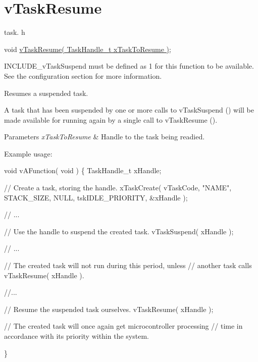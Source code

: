 \hypertarget{group__vTaskResume}{}\section{v\+Task\+Resume}
\label{group__vTaskResume}
task. h 
\begin{DoxyPre}void \hyperlink{task_8h_a84a1584f29fb7736a1aa72ad5b3e9b44}{vTaskResume( TaskHandle\_t xTaskToResume )};\end{DoxyPre}


I\+N\+C\+L\+U\+D\+E\+\_\+v\+Task\+Suspend must be defined as 1 for this function to be available. See the configuration section for more information.

Resumes a suspended task.

A task that has been suspended by one or more calls to v\+Task\+Suspend () will be made available for running again by a single call to v\+Task\+Resume ().


\begin{DoxyParams}{Parameters}
{\em x\+Task\+To\+Resume} & Handle to the task being readied.\\
\hline
\end{DoxyParams}
Example usage\+: 
\begin{DoxyPre}
void vAFunction( void )
\{
TaskHandle\_t xHandle;
\begin{DoxyVerb}// Create a task, storing the handle.
xTaskCreate( vTaskCode, "NAME", STACK_SIZE, NULL, tskIDLE_PRIORITY, &xHandle );

// ...

// Use the handle to suspend the created task.
vTaskSuspend( xHandle );

// ...

// The created task will not run during this period, unless
// another task calls vTaskResume( xHandle ).

//...


// Resume the suspended task ourselves.
vTaskResume( xHandle );

// The created task will once again get microcontroller processing
// time in accordance with its priority within the system.
\end{DoxyVerb}

\}
  \end{DoxyPre}
 